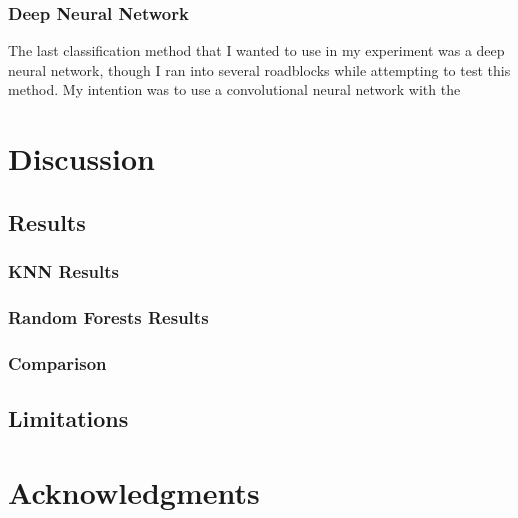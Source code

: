 \documentclass[12pt, oneside]{article}
\begin{document}
\begin{normalsize}
\subsubsection{Deep Neural Network}

The last classification method that I wanted to use in my experiment was a deep neural network, though I ran into several roadblocks while attempting to test this method. My intention was to use a convolutional neural network with the 


\end{normalsize}

\section{Discussion}
\label{Discussion}

\begin{normalsize}

\subsection{Results}

\subsubsection{KNN Results}

\subsubsection{Random Forests Results}

\subsubsection{Comparison}

\subsection{Limitations}

\end{normalsize}

\section{Acknowledgments}
\label{Acknowledgments}
\end{document}

